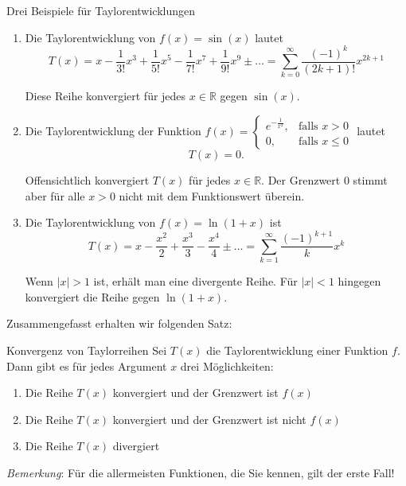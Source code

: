 \begin{bsp}
    {Drei Beispiele für Taylorentwicklungen}{}
    \begin{enumerate}
        \item Die Taylorentwicklung von \(f(x) = \sin(x)\) lautet
        \[T(x) = x - \frac{1}{3!}x^3 + \frac{1}{5!}x^5 - \frac{1}{7!}x^7 + \frac{1}{9!}x^9 \pm \ldots = \sum_{k=0}^{\infty} \frac{(-1)^k}{(2k+1)!} x^{2k+1}\]
        
        Diese Reihe konvergiert für jedes \(x \in \mathbb{R}\) gegen \(\sin(x)\).
        \item Die Taylorentwicklung der Funktion \( f(x) = \begin{cases} e^{-\frac{1}{x^2}}, & \text{falls } x > 0 \\ 0, & \text{falls } x \leq 0 \end{cases} \) lautet
        \[ T(x) = 0. \]
        
        Offensichtlich konvergiert \( T(x) \) für jedes \( x \in \mathbb{R} \). Der Grenzwert 0 stimmt aber für alle \( x > 0 \) nicht mit dem Funktionswert überein.
        \item Die Taylorentwicklung von \( f(x) = \ln(1+x) \) ist
        \[ T(x) = x - \frac{x^2}{2} + \frac{x^3}{3} - \frac{x^4}{4} \pm \ldots = \sum_{k=1}^{\infty} \frac{(-1)^{k+1}}{k} x^k \]
        
        Wenn \( |x| > 1 \) ist, erhält man eine divergente Reihe. Für \( |x| < 1 \) hingegen konvergiert die Reihe gegen \( \ln(1+x) \).
        
    \end{enumerate}
\end{bsp}
Zusammengefasst erhalten wir folgenden Satz:
\begin{satz}
    {Konvergenz von Taylorreihen}{}
    Sei $T(x)$ die Taylorentwicklung einer Funktion $f$. Dann gibt es für jedes Argument $x$ drei Möglichkeiten:
    \begin{enumerate}
        \item Die Reihe $T(x)$ konvergiert und der Grenzwert ist $f(x)$
        \item         Die Reihe $T(x)$ konvergiert und der Grenzwert ist nicht $f(x)$
        \item 
        Die Reihe $T(x)$ divergiert
    \end{enumerate}	

\end{satz}
\emph{Bemerkung}: Für die allermeisten Funktionen, die Sie kennen, gilt der erste Fall!

